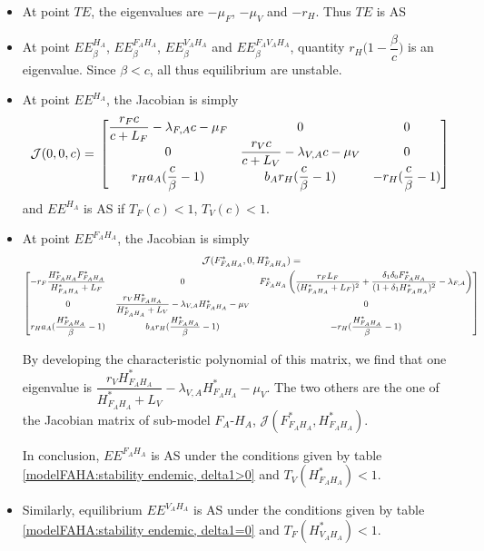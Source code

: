 \documentclass{article}
\newcommand{\lfa}{\lambda_{F, A}}
\newcommand{\lva}{\lambda_{V, A}}
\begin{document}
\begin{itemize}
 \item At point $TE$, the eigenvalues are $-\mu_F$, $-\mu_V$ and $-r_H$. Thus $TE$ is AS
 \item At point $EE^{H_A}_\beta$, $EE^{F_AH_A}_\beta$, $EE^{V_AH_A}_\beta$ and $EE^{F_AV_AH_A}_\beta$, quantity $r_H \Big(1 - \dfrac{\beta}{c} \Big)$ is an eigenvalue. Since $\beta < c$, all thus equilibrium are unstable.
 \item At point $EE^{H_A}$, the Jacobian is simply
$$
\mathcal{J}(0,0,c) = \\
\begin{bmatrix}
\dfrac{r_F c}{c+L_F} - \lfa c - \mu_F & 0 & 0\\
0 & \dfrac{r_V c}{c+L_V} - \lva c - \mu_V & 0 \\
r_H a_A (\dfrac{c}{\beta}-1) & b_A r_H (\dfrac{c}{\beta}-1) & -r_H (\dfrac{c}{\beta}-1)
\end{bmatrix}
$$
and $EE^{H_A}$ is AS if $T_F(c) < 1$, $T_V(c) < 1$.

\item At point $EE^{F_AH_A}$, the Jacobian is simply
\begin{multline}
\mathcal{J}(F^*_{F_AH_A},0,H^*_{F_AH_A}) = \\
{\small
\begin{bmatrix}
-r_F \dfrac{H^*_{F_AH_A}F^*_{F_AH_A}}{H^*_{F_AH_A} + L_F} & 0 & F^*_{F_AH_A} \left(\dfrac{r_F L_F}{(H^*_{F_AH_A} + L_F)^2} + \dfrac{\delta_1 \delta_0 F^*_{F_AH_A}}{(1 + \delta_1 H^*_{F_AH_A})^2} - \lfa \right)\\
0 & \dfrac{r_V H^*_{F_AH_A}}{H^*_{F_AH_A}+L_V} - \lva H^*_{F_AH_A} - \mu_V & 0 \\
r_H a_A (\dfrac{H^*_{F_AH_A}}{\beta}-1) & b_A r_H (\dfrac{H^*_{F_AH_A}}{\beta}-1) & - r_H(\dfrac{H^*_{F_AH_A}}{\beta}-1)
\end{bmatrix}}
\end{multline}

By developing the characteristic polynomial of this matrix, we find that one eigenvalue is $\dfrac{r_V H^*_{F_AH_A}}{H^*_{F_AH_A}+L_V} - \lva H^*_{F_AH_A} - \mu_V$. The two others are the one of the Jacobian matrix of sub-model $F_A$-$H_A$, $\mathcal{J}(F^*_{F_AH_A}, H^*_{F_AH_A})$.

In conclusion, $EE^{F_AH_A}$ is AS under the conditions given by table \ref{modelFAHA:stability endemic, delta1>0} and $T_V(H^*_{F_AH_A}) < 1$.

\item Similarly, equilibrium $EE^{V_AH_A}$ is AS under the conditions given by table \ref{modelFAHA:stability endemic, delta1=0} and $T_F(H^*_{V_AH_A})<1$.



\end{itemize}
\end{document}
